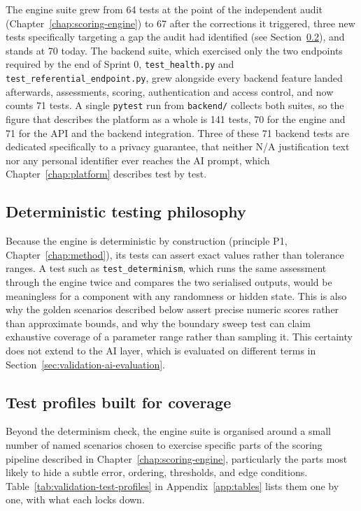 The engine suite grew from 64 tests at the point of the independent audit
(Chapter~\ref{chap:scoring-engine}) to 67 after the corrections it triggered, three
new tests specifically targeting a gap the audit had identified (see
Section~\ref{sec:validation-test-profiles}), and stands at 70 today. The backend
suite, which exercised only the two endpoints required by the end of Sprint
0, \texttt{test\_health.py} and \texttt{test\_referential\_endpoint.py}, grew
alongside every backend feature landed afterwards, assessments, scoring,
authentication and access control, and now counts 71 tests. A single
\texttt{pytest} run from \texttt{backend/} collects both suites, so the
figure that describes the platform as a whole is 141 tests, 70 for the
engine and 71 for the API and the backend integration. Three of these 71
backend tests are dedicated specifically to a privacy guarantee, that
neither N/A justification text nor any personal identifier ever reaches the
AI prompt, which Chapter~\ref{chap:platform} describes test by test.

\subsection{Deterministic testing philosophy}
\label{sec:validation-deterministic-philosophy}

Because the engine is deterministic by construction (principle P1,
Chapter~\ref{chap:method}), its tests can assert exact values rather than
tolerance ranges. A test
such as \texttt{test\_determinism}, which runs the same assessment through
the engine twice and compares the two serialised outputs, would be
meaningless for a component with any randomness or hidden state. This is
also why the golden scenarios described below assert precise numeric scores
rather than approximate bounds, and why the boundary sweep test can claim
exhaustive coverage of a parameter range rather than sampling it. This
certainty does not extend to the AI layer, which is evaluated on different
terms in Section~\ref{sec:validation-ai-evaluation}.

\subsection{Test profiles built for coverage}
\label{sec:validation-test-profiles}

Beyond the determinism check, the engine suite is organised around a small
number of named scenarios chosen to exercise specific parts of the scoring
pipeline described in Chapter~\ref{chap:scoring-engine}, particularly the parts most likely to hide
a subtle error, ordering, thresholds, and edge conditions. Table~\ref{tab:validation-test-profiles} in Appendix~\ref{app:tables} lists them one by one, with what each locks down.




